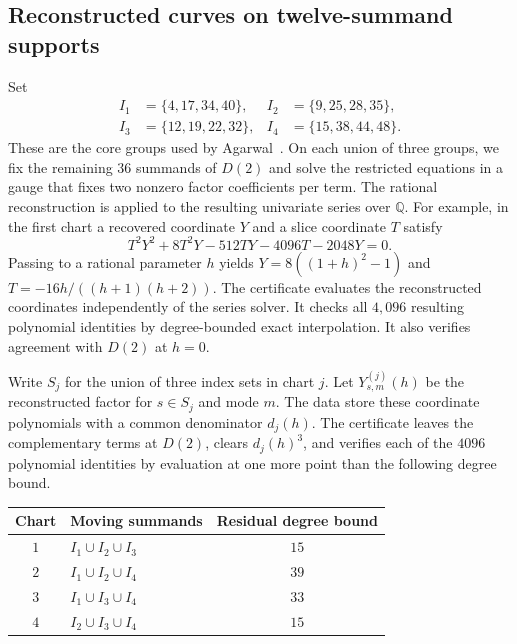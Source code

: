 \documentclass[11pt,reqno]{amsart}
\newcommand{\Q}{\mathbb Q}
\begin{document}
\subsection*{Reconstructed curves on twelve-summand supports}
Set
\[
\begin{aligned}
 I_1&=\{4,17,34,40\}, & I_2&=\{9,25,28,35\},\\
 I_3&=\{12,19,22,32\}, & I_4&=\{15,38,44,48\}.
\end{aligned}
\]
These are the core groups used by Agarwal~\cite{agarwal}. On each union of three groups, we fix the remaining \(36\) summands of \(D(2)\) and solve the restricted equations in a gauge that fixes two nonzero factor coefficients per term. The rational reconstruction is applied to the resulting univariate series over \(\Q\). For example, in the first chart a recovered coordinate \(Y\) and a slice coordinate \(T\) satisfy
\[
 T^2Y^2+8T^2Y-512TY-4096T-2048Y=0.
\]
Passing to a rational parameter \(h\) yields
\(Y=8((1+h)^2-1)\) and \(T=-16h/((h+1)(h+2))\).
The certificate evaluates the reconstructed coordinates independently of the series solver. It checks all \(4,096\) resulting polynomial identities by degree-bounded exact interpolation. It also verifies agreement with \(D(2)\) at \(h=0\).

Write \(S_j\) for the union of three index sets in chart \(j\). Let \(Y_{s,m}^{(j)}(h)\) be the reconstructed factor for \(s\in S_j\) and mode \(m\). The data store these coordinate polynomials with a common denominator \(d_j(h)\). The certificate leaves the complementary terms at \(D(2)\), clears \(d_j(h)^3\), and verifies each of the \(4096\) polynomial identities by evaluation at one more point than the following degree bound.
\begin{center}
\small
\begin{tabular}{@{}clc@{}}
\toprule
Chart & Moving summands & Residual degree bound\\
\midrule
\(1\) & \(I_1\cup I_2\cup I_3\) & \(15\)\\
\(2\) & \(I_1\cup I_2\cup I_4\) & \(39\)\\
\(3\) & \(I_1\cup I_3\cup I_4\) & \(33\)\\
\(4\) & \(I_2\cup I_3\cup I_4\) & \(15\)\\
\bottomrule
\end{tabular}
\end{center}
\end{document}
